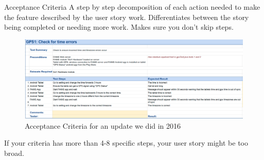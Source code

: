 \documentclass[aspectratio=1610, 11pt]{beamer} %
\begin{document}
\begin{frame}{Acceptance Criteria}
A step by step decomposition of each action needed to make the feature described by the user story work. Differentiates between the story being completed or needing more work. Makes sure you don't skip steps.
\begin{figure}
    \centering
    \includegraphics[width=\textwidth]{figures/acceptance.png}
    \caption{Acceptance Criteria for an update we did in 2016}
    \label{fig:my_label}
\end{figure}

If your criteria has more than 4-8 specific steps, your user story might be too broad. 
\end{frame}
\end{document}
